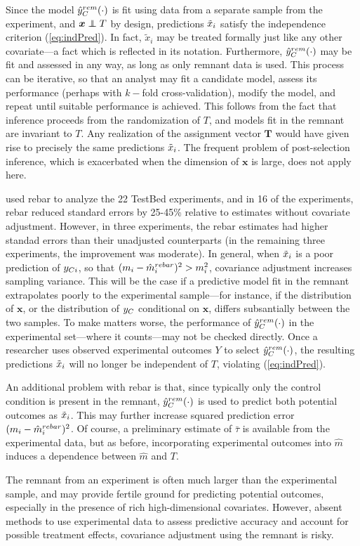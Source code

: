 Since the model $\hat{y}_C^{rem}(\cdot) $ is fit using data from a
separate sample from the experiment, and $\bm{x}\independent T$ by
design, predictions $\tilde{x}_i $ satisfy the
independence criterion (\ref{eq:indPred}).
In fact, $\tilde{x}_{i}$ may be treated formally just like any other
covariate---a fact which is reflected in its notation.
Furthermore, $\hat{y}_C^{rem}(\cdot)$ may be fit and assessed in any way, as
long as only remnant data is used.
This process can be iterative, so that an analyst may fit a candidate
model, assess its performance (perhaps with $k-$fold
cross-validation), modify the model, and repeat until suitable
performance is achieved.
This follows from the fact that inference proceeds from the
randomization of $T$, and models fit in the remnant are invariant to
$T$.
Any realization of the assignment vector $\bm{T}$ would have given
rise to precisely the same predictions $\tilde{x}_i $.
The frequent problem of post-selection inference, which is exacerbated
when the dimension of $\bm{x}$ is large, does not apply here.

\citet{rebarEDM} used rebar to analyze the 22 TestBed experiments, and
in 16 of the experiments, rebar reduced standard
errors by 25-45\% relative to estimates without covariate adjustment.
However, in three experiments, the rebar estimates had higher standad
errors than their unadjusted counterparts (in the remaining three
experiments, the improvement was moderate).
In general, when $\tilde{x}_i$ is a poor
prediction of $y_{Ci}$, so that $(m_i-\hat{m}_i^{rebar})^2>m_i^2$, covariance
adjustment increases sampling variance.
This will be the case if a predictive model fit in the remnant
extrapolates poorly to the experimental sample---for instance, if the
distribution of $\bm{x}$, or the distribution of $y_C$
conditional on $\bm{x}$, differs subsantially between the two samples.
To make matters worse, the performance of $\hat{y}_C^{rem}(\cdot)$ in the
experimental set---where it counts---may not be checked directly.
Once a researcher uses observed experimental outcomes $Y$ to select
$\hat{y}_C^{rem}(\cdot)$, the resulting predictions $\tilde{x}_i$
will no longer be independent of $T$, violating
(\ref{eq:indPred}).

An additional problem with rebar is that, since typically only the
control condition is present in the remnant, $\hat{y}_C^{rem}(\cdot)$ is used
to predict both potential outcomes as $\tilde{x}_i$.
This may further increase squared prediction error $(m_i-\hat{m}_i^{rebar})^2$.
Of course, a preliminary estimate of $\bar{\tau}$ is available from
the experimental data, but as before, incorporating experimental
outcomes into $\hat{m}$ induces a dependence between $\hat{m}$ and
$T$.

The remnant from an experiment is often much larger than the
experimental sample, and may provide fertile ground for predicting
potential outcomes, especially in the presence of rich
high-dimensional covariates.
However, absent methods to use experimental data to assess predictive
accuracy and account for possible treatment effects, covariance
adjustment using the remnant is risky.
